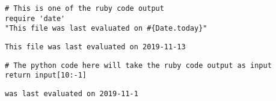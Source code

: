 \documentclass[11pt]{article}
\begin{document}
\begin{verbatim}
# This is one of the ruby code output
require 'date'
"This file was last evaluated on #{Date.today}"
\end{verbatim}

\begin{verbatim}
This file was last evaluated on 2019-11-13
\end{verbatim}


\begin{verbatim}
# The python code here will take the ruby code output as input
return input[10:-1]
\end{verbatim}

\begin{verbatim}
was last evaluated on 2019-11-1
\end{verbatim}
\end{document}
